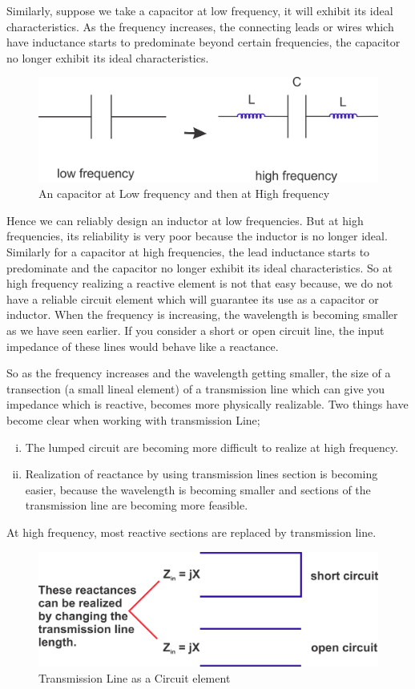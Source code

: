 Similarly, suppose we take a capacitor at low frequency, it will exhibit its ideal characteristics. As the frequency increases, the connecting leads or wires which have inductance starts to predominate beyond certain frequencies, the capacitor no longer exhibit its ideal characteristics.
\begin{figure}[h]
\centering
\includegraphics[width=1\linewidth]{./graphics/group10diagram4}
\caption{An capacitor at Low frequency and then at High frequency}
\end{figure}

Hence we can reliably design an inductor at low frequencies. But at high frequencies, its reliability is very poor because the inductor is no longer ideal. Similarly for a capacitor at high frequencies, the lead inductance starts to predominate and the capacitor no longer exhibit its ideal characteristics. So at high frequency realizing a reactive element is not that easy because, we do not have a reliable circuit element which will guarantee its use as a capacitor or inductor. When the frequency is increasing, the wavelength is becoming smaller as we have seen earlier. 
If you consider a short or open circuit line, the input impedance of these lines would behave like a reactance.

So as the frequency increases and the wavelength getting smaller, the size of a transection (a small lineal element) of a transmission line which can give you impedance which is reactive, becomes more physically realizable.
Two things have become clear when working with transmission
Line;
\begin{enumerate}[(i)]
\item The lumped circuit are becoming more difficult to realize at high frequency.
\item Realization of reactance by using transmission lines section is becoming easier, because the wavelength is becoming smaller and sections of the transmission line are becoming more feasible.
\end{enumerate}
At high frequency, most reactive sections are replaced by transmission line.
\begin{figure}[h]
\centering
\includegraphics[width=1\linewidth]{./graphics/group10diagram5}
\caption{Transmission Line as a Circuit element}
\end{figure}

